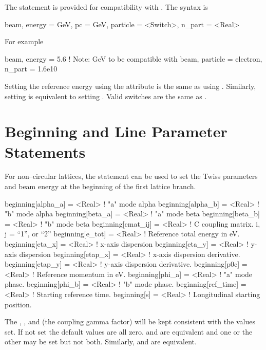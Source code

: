 The  statement is provided for compatibility with \mad. The syntax is
\begin{example}
  beam, energy = GeV, pc = GeV, particle = <Switch>, n_part = <Real>
\end{example}
For example
\begin{example}
  beam, energy = 5.6  ! Note: GeV to be compatible with \mad
  beam, particle = electron, n_part = 1.6e10
\end{example}
Setting the reference energy using the  attribute is the
same as using . Similarly, setting  is
equivalent to setting . Valid  switches
are the same as .

\section{Beginning and Line Parameter Statements}
\label{s:beginning}

For non--circular lattices, the  statement can be used to
set the Twiss parameters and beam energy at the beginning of the first lattice branch.
\begin{example}
  beginning[alpha_a]  = <Real>  ! "a" mode alpha
  beginning[alpha_b]  = <Real>  ! "b" mode alpha
  beginning[beta_a]   = <Real>  ! "a" mode beta
  beginning[beta_b]   = <Real>  ! "b" mode beta
  beginning[cmat_ij]  = <Real>  ! C coupling matrix. i, j = {``1'', or ``2''} 
  beginning[e_tot]    = <Real>  ! Reference total energy in eV.
  beginning[eta_x]    = <Real>  ! x-axis dispersion
  beginning[eta_y]    = <Real>  ! y-axis dispersion
  beginning[etap_x]   = <Real>  ! x-axis dispersion derivative.
  beginning[etap_y]   = <Real>  ! y-axis dispersion derivative.
  beginning[p0c]      = <Real>  ! Reference momentum in eV.
  beginning[phi_a]    = <Real>  ! "a" mode phase.
  beginning[phi_b]    = <Real>  ! "b" mode phase.
  beginning[ref_time] = <Real>  ! Starting reference time.
  beginning[s]        = <Real>  ! Longitudinal starting position.
\end{example}
The , , and  (the coupling gamma
factor) will be kept consistent with the values set. If not set the
default values are all zero.   and
 are equivalent and one or the other may be
set but not both. Similarly,  and
 are equivalent.

